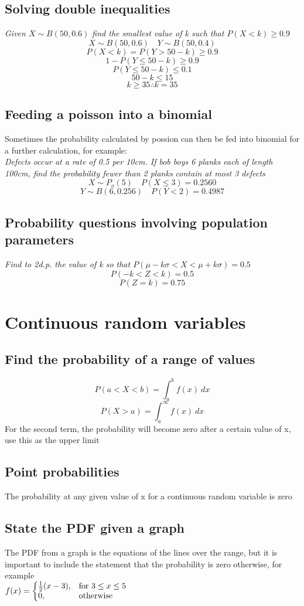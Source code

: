 \documentclass{article}[18pt]
\begin{document}
\subsection{Solving double inequalities}
\textit{Given $X\sim B(50,0.6)$ find the smallest value of k such that $P(X<k)\geqslant0.9$}
$$X\sim B(50,0.6) \quad Y\sim B(50,0.4)$$
$$P(X<k)=P(Y>50-k)\geqslant0.9$$
$$1-P(Y\leqslant 50-k)\geqslant 0.9$$
$$P(Y\leqslant50-k)\leqslant0.1$$
$$50-k\leqslant15$$
$$k\geqslant35 \therefore k=35$$
\newpage
\subsection{Feeding a poisson into a binomial}
Sometimes the probability calculated by possion can then be fed into binomial for a further calculation, for example:\\
\textit{Defects occur at a rate of 0.5 per 10cm. If bob boys 6 planks each of length 100cm, find the probability fewer than 2 planks contain at most 3 defects}
$$X\sim P_o(5) \quad P(X\leqslant3)=0.2560$$
$$Y\sim B(6,0.256) \quad P(Y<2)=0.4987$$
\subsection{Probability questions involving population parameters}
\textit{Find to 2d.p. the value of k so that $P(\mu-k\sigma<X<\mu+k\sigma)=0.5$}
$$P(-k<Z<k)=0.5$$
$$P(Z=k)=0.75$$
\section{Continuous random variables}
\subsection{Find the probability of a range of values}
$$P(a<X<b)=\int^b_a f(x) \ dx$$
$$P(X>a)=\int^\infty_a f(x) \ dx$$
For the second term, the probability will become zero after a certain value of x, use this as the upper limit
\subsection{Point probabilities}
The probability at any given value of x for a continuous random variable is zero
\subsection{State the PDF given a graph}
The PDF from a graph is the equations of the lines over the range, but it is important to include the statement that the probability is zero otherwise, for example\\
$
  f(x)=\left\{
  \begin{array}{@{}ll@{}}
    \frac{1}{2}(x-3), & \text{for}\ 3\leq x \leq 5  \\
    0, & \text{otherwise}
  \end{array}\right.
$
\end{document}
